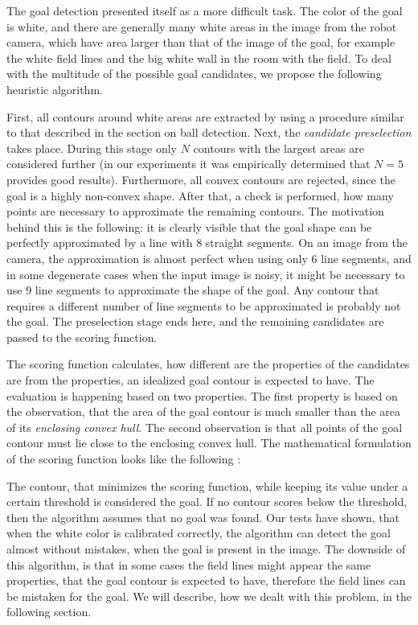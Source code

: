 The goal detection presented itself as a more difficult task. The color of the
goal is white, and there are generally many white areas in the image from the
robot camera, which have area larger than that of the image of the goal, for
example the white field lines and the big white wall in the room with the
field. To deal with the multitude of the possible goal candidates, we
propose the following heuristic algorithm.

First, all contours around white areas are extracted by using a procedure
similar to that described in the section on ball detection. Next, the
\textit{candidate preselection} takes place. During this stage only $N$
contours with the largest areas are considered further (in our experiments it
was empirically determined that $N=5$ provides good results). Furthermore, all
convex contours are rejected, since the goal is a highly non-convex shape.
After that, a check is performed, how many points are necessary to approximate
the remaining contours. The motivation behind this is the following: it is
clearly visible that the goal shape can be perfectly approximated by a line
with 8 straight segments. On an image from the camera, the approximation is
almost perfect when using only 6 line segments, and in some degenerate cases
when the input image is noisy, it might be necessary to use 9 line segments to
approximate the shape of the goal. Any contour that requires a different number
of line segments to be approximated is probably not the goal. The preselection
stage ends here, and the remaining candidates are passed to the scoring
function.

The scoring function calculates, how different are the properties of the
candidates are from the properties, an idealized goal contour is expected to
have. The evaluation is happening based on two properties. The first property
is based on the observation, that the area of the goal contour is much smaller
than the area of its \textit{enclosing convex hull}. The second observation is
that all points of the goal contour must lie close to the enclosing convex
hull. The mathematical formulation of the scoring function looks like the
following :

The contour, that minimizes the scoring function, while keeping its value under
a certain threshold is considered the goal. If no contour scores below the
threshold, then the algorithm assumes that no goal was found. Our tests have
shown, that when the white color is calibrated correctly, the algorithm can
detect the goal almost without mistakes, when the goal is present in the image.
The downside of this algorithm, is that in some cases the field lines might
appear the same properties, that the goal contour is expected to have,
therefore the field lines can be mistaken for the goal. We will describe, how
we dealt with this problem, in the following section.

